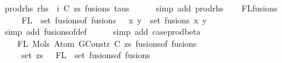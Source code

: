 \begin{isabellebody}
\ prod{\isacharunderscore}{\kern0pt}rhs{}{\isacharcolon}{\kern0pt}\ {\isachardoublequoteopen}rhs\ {\isacharequal}{\kern0pt}\ {\isacharparenleft}{\kern0pt}i{\isacharcomma}{\kern0pt}\ {\isacharparenleft}{\kern0pt}C{\isacharcomma}{\kern0pt}\ zs{\isacharparenright}{\kern0pt}{\isacharcomma}{\kern0pt}\ fusions{\isacharcomma}{\kern0pt}\ taus{\isacharparenright}{\kern0pt}{\isachardoublequoteclose}\isanewline
\ \ \ \ \isamarkupfalse%
\ {\isacharparenleft}{\kern0pt}simp\ add{\isacharcolon}{\kern0pt}\ prod{\isacharunderscore}{\kern0pt}rhs{\isacharparenright}{\kern0pt}\isanewline
\isanewline
\isanewline
\ \ \isamarkupfalse%
\ FL{\isacharunderscore}{\kern0pt}fusions{\isacharcolon}{\kern0pt}\isanewline
\ \ \ \ {\isachardoublequoteopen}{\isasymUnion}\ {\isacharparenleft}{\kern0pt}FL\ {\isacharbackquote}{\kern0pt}\ set\ {\isacharparenleft}{\kern0pt}fusions{\isacharunderscore}{\kern0pt}of\ fusions{\isacharparenright}{\kern0pt}{\isacharparenright}{\kern0pt}\ {\isacharequal}{\kern0pt}\ {\isacharparenleft}{\kern0pt}{\isasymUnion}\ {\isacharparenleft}{\kern0pt}x{\isacharcomma}{\kern0pt}\ y{\isacharparenright}{\kern0pt}\ {\isasymin}\ set\ fusions{\isachardot}{\kern0pt}\ {\isacharbraceleft}{\kern0pt}x{\isacharcomma}{\kern0pt}\ y{\isacharbraceright}{\kern0pt}{\isacharparenright}{\kern0pt}{\isachardoublequoteclose}\isanewline
\ \ \ \ \isamarkupfalse%
\ {\isacharparenleft}{\kern0pt}simp\ add{\isacharcolon}{\kern0pt}\ fusions{\isacharunderscore}{\kern0pt}of{\isacharunderscore}{\kern0pt}def{\isacharparenright}{\kern0pt}\isanewline
\ \ \ \ \isamarkupfalse%
\ {\isacharparenleft}{\kern0pt}simp\ add{\isacharcolon}{\kern0pt}\ case{\isacharunderscore}{\kern0pt}prod{\isacharunderscore}{\kern0pt}beta{\isacharparenright}{\kern0pt}\isanewline
\isanewline
\ \ \isamarkupfalse%
\isanewline
\ \ \ \ {\isachardoublequoteopen}FL\ {\isacharparenleft}{\kern0pt}Mols{}\ {\isacharparenleft}{\kern0pt}Atom\ {\isacharparenleft}{\kern0pt}GConstr\ C{\isacharparenright}{\kern0pt}\ zs{\isacharparenright}{\kern0pt}\ {\isacharparenleft}{\kern0pt}fusions{\isacharunderscore}{\kern0pt}of\ fusions{\isacharparenright}{\kern0pt}{\isacharparenright}{\kern0pt}\ {\isacharequal}{\kern0pt}\isanewline
\ \ \ \ \ set\ zs\ {\isasymunion}\ {\isasymUnion}\ {\isacharparenleft}{\kern0pt}FL\ {\isacharbackquote}{\kern0pt}\ set\ {\isacharparenleft}{\kern0pt}fusions{\isacharunderscore}{\kern0pt}of\ fusions{\isacharparenright}{\kern0pt}{\isacharparenright}{\kern0pt}{\isachardoublequoteclose}\isanewline
\ \ \ \ \isamarkupfalse%

\end{isabellebody}
